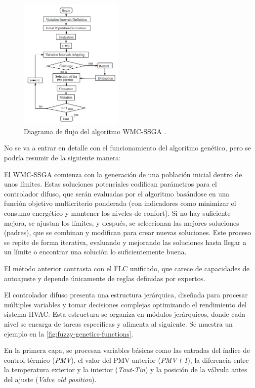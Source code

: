 \begin{figure}[H]
	\centering
	\includegraphics[width=0.45\textwidth]{imgs/flowchart-ga.JPG}
	\caption{Diagrama de flujo del algoritmo WMC-SSGA \parencite{alcala2003fuzzy}.}
	\label{fig:flowchart-ga}
\end{figure}

No se va a entrar en detalle con el funcionamiento del algoritmo genético, pero se podría resumir de la siguiente manera:

El WMC-SSGA comienza con la generación de una población inicial dentro de unos límites. Estas soluciones potenciales codifican parámetros para el controlador difuso, que serán evaluadas por el algoritmo basándose en una función objetivo multicriterio ponderada (con indicadores como minimizar el consumo energético y mantener los niveles de confort). Si no hay suficiente mejora, se ajustan los límites, y después, se seleccionan las mejores soluciones (padres), que se combinan y modifican para crear nuevas soluciones. Este proceso se repite de forma iterativa, evaluando y mejorando las soluciones hasta llegar a un límite o encontrar una solución lo suficientemente buena.

El método anterior contrasta con el FLC unificado, que carece de capacidades de autoajuste y depende únicamente de reglas definidas por expertos.

El controlador difuso presenta una estructura jerárquica, diseñada para procesar múltiples variables y tomar decisiones complejas optimizando el rendimiento del sistema HVAC. Esta estructura se organiza en módulos jerárquicos, donde cada nivel se encarga de tareas específicas y alimenta al siguiente. Se muestra un ejemplo en la \autoref{fig:fuzzy-genetics-functions}.

En la primera capa, se procesan variables básicas como las entradas del índice de control térmico (\textit{PMV}), el valor del PMV anterior (\textit{PMV t-1}), la diferencia entre la temperatura exterior y la interior (\textit{Tout-Tin}) y la posición de la válvula antes del ajuste (\textit{Valve old position}). 

